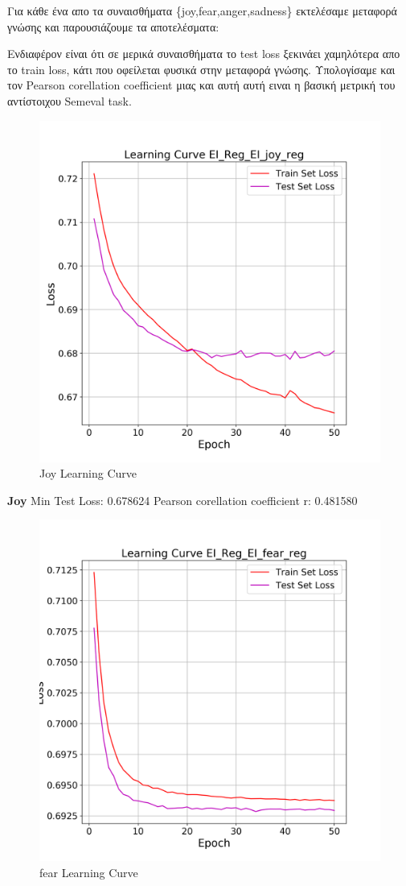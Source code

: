 \documentclass[12pt]{article}
\begin{document}
Για κάθε ένα απο τα συναισθήματα \{joy,fear,anger,sadness\} εκτελέσαμε μεταφορά γνώσης και παρουσιάζουμε τα αποτελέσματα:


Ενδιαφέρον είναι ότι σε μερικά συναισθήματα το test loss ξεκινάει χαμηλότερα απο το train loss, κάτι που οφείλεται φυσικά στην μεταφορά γνώσης. Υπολογίσαμε και τον Pearson corellation coefficient μιας και αυτή αυτή ειναι η βασική μετρική του αντίστοιχου Semeval task.


\begin{figure}[h!]
	\centering
	\includegraphics[width=0.6\linewidth]{./img/EI_Reg/EI_joy_reg_loss}
	\caption{Joy Learning Curve}
	\label{fig:sin}
\end{figure}

\textbf{Joy}
Min Test Loss: 0.678624
Pearson corellation coefficient r: 0.481580
\begin{figure}[h!]
	\centering
	\includegraphics[width=0.6\linewidth]{./img/EI_Reg/EI_fear_reg_loss}
	\caption{fear Learning Curve}
	\label{fig:sin}
\end{figure}
\end{document}
